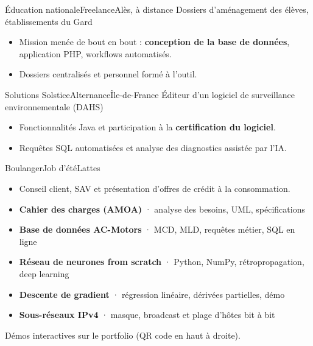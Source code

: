 \begin{minipage}[t]{\mainwidth}
  {Éducation nationale}{Freelance}{Alès, à distance}
  {Dossiers d'aménagement des élèves, établissements du Gard}
\begin{itemize}
  \item Mission menée de bout en bout : \textbf{conception de la base de données}, application PHP, workflows automatisés.
  \item Dossiers centralisés et personnel formé à l'outil.
\end{itemize}

  {Solutions Solstice}{Alternance}{Île-de-France}
  {Éditeur d'un logiciel de surveillance environnementale (DAHS)}
\begin{itemize}
  \item Fonctionnalités Java et participation à la \textbf{certification du logiciel}.
  \item Requêtes SQL automatisées et analyse des diagnostics assistée par l'IA.
\end{itemize}

  {Boulanger}{Job d'été}{Lattes}{}
\begin{itemize}
  \item Conseil client, SAV et présentation d'offres de crédit à la consommation.
\end{itemize}

\begin{itemize}[itemsep=1pt]
  \item \textbf{Cahier des charges (AMOA)} {\color{muted}· analyse des besoins, UML, spécifications}
  \item \textbf{Base de données AC-Motors} {\color{muted}· MCD, MLD, requêtes métier, SQL en ligne}
  \item \textbf{Réseau de neurones from scratch} {\color{muted}· Python, NumPy, rétropropagation, deep learning}
  \item \textbf{Descente de gradient} {\color{muted}· régression linéaire, dérivées partielles, démo}
  \item \textbf{Sous-réseaux IPv4} {\color{muted}· masque, broadcast et plage d'hôtes bit à bit}
\end{itemize}
{\small\color{muted}Démos interactives sur le portfolio (QR code en haut à droite).}

\end{minipage}%
\hfill%

